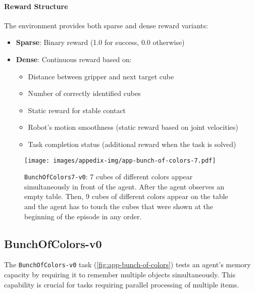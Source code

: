 \paragraph{Reward Structure} The environment provides both sparse and dense reward variants:
\begin{itemize}
    \item \textbf{Sparse}: Binary reward (1.0 for success, 0.0 otherwise)
    \item \textbf{Dense}: Continuous reward based on:
    \begin{itemize}
        \item Distance between gripper and next target cube
        \item Number of correctly identified cubes
        \item Static reward for stable contact
        \item Robot's motion smoothness (static reward based on joint velocities)
        \item Task completion status (additional reward when the task is solved)
    \end{itemize}
\end{itemize}

\newpage
\begin{figure*}[h!]
    \centering
    \texttt{[image: images/appedix-img/app-bunch-of-colors-7.pdf]}
    \vspace{-15pt}
    \caption{\texttt{BunchOfColors7-v0}: 7 cubes of different colors appear simultaneously in front of the agent. After the agent observes an empty table. Then, 9 cubes of different colors appear on the table and the agent has to touch the cubes that were shown at the beginning of the episode in any order.}
    \label{fig:app-bunch-of-colors}
    \vspace{-15pt}
\end{figure*}
\subsection{BunchOfColors-v0}
\label{app:bunch-of-colors}

The \texttt{BunchOfColors-v0} task (\autoref{fig:app-bunch-of-colors}) tests an agent's memory capacity by requiring it to remember multiple objects simultaneously. This capability is crucial for tasks requiring parallel processing of multiple items.

